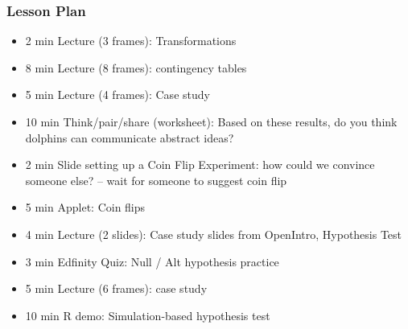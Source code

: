 \begin{frame}
    \frametitle{Lesson Plan}
    \begin{itemize}
        \item 2 min Lecture (3 frames): Transformations
        \item 8 min Lecture (8 frames): contingency tables
        
        \item 5 min Lecture (4 frames): Case study
        \item 10 min Think/pair/share (worksheet): Based on these results, do you think dolphins can communicate abstract ideas?
        \item 2 min Slide setting up a Coin Flip Experiment: how could we convince someone else? -- wait for someone to suggest coin flip
        \item 5 min Applet: Coin flips
        \item 4 min Lecture (2 slides): Case study slides from OpenIntro, Hypothesis Test
        \item 3 min Edfinity Quiz: Null / Alt hypothesis practice
        \item 5 min Lecture (6 frames): case study
        \item 10 min R demo: Simulation-based hypothesis test
        
    \end{itemize}
\end{frame}



